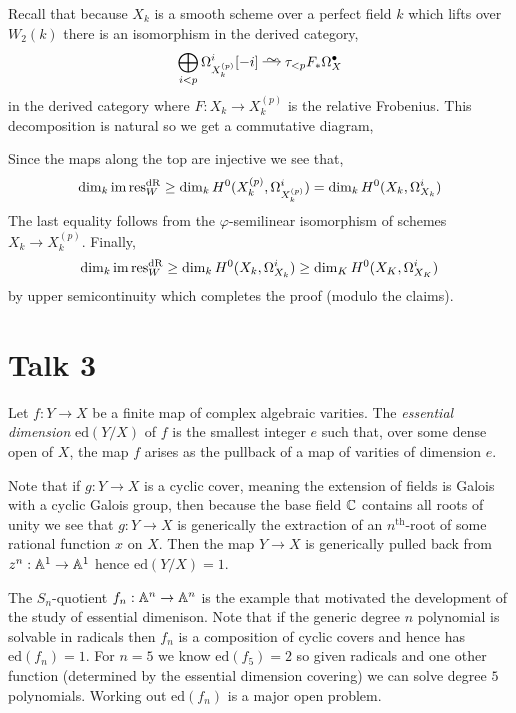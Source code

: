 \documentclass[12pt]{article}
\begin{document}
Recall that because $X_k$ is a smooth scheme over a perfect field $k$ which lifts over $W_2(k)$ there is an isomorphism in the derived category,
\[  \bigoplus_{i < p} \Omega^i_{X^{(p)}_k}[-i] \iso \tau_{<p} F_* \Omega^\bullet_X \]
in the derived category where $F : X_k \to X_k^{(p)}$ is the relative Frobenius. This decomposition is natural so we get a commutative diagram,
\begin{center}
\end{center}
Since the maps along the top are injective we see that,
\[ \dim_k \operatorname{\mathrm{im}}{\mathrm{res}^{\mathrm{dR}}_W} \ge \dim_k H^0(X_k^{(p)}, \Omega^i_{X_k^{(p)}}) = \dim_k H^0(X_k, \Omega^i_{X_k}) \]
The last equality follows from the $\varphi$-semilinear isomorphism of schemes $X_k \to X_k^{(p)}$.
Finally,
\[ \dim_k \operatorname{\mathrm{im}}{\mathrm{res}^{\mathrm{dR}}_W} \ge \dim_k H^0(X_k, \Omega^i_{X_k}) \ge \dim_K H^0(X_K, \Omega^i_{X_K}) \]
by upper semicontinuity which completes the proof (modulo the claims). 

\section{Talk 3}

\newcommand{\ed}{\mathrm{ed}}

\begin{defn}
Let $f : Y \to X$ be a finite map of complex algebraic varities. The \textit{essential dimension} $\ed(Y/X)$ of $f$ is the smallest integer $e$ such that, over some dense open of $X$, the map $f$ arises as the pullback of a map of varities of dimension $e$. 
\end{defn}

\begin{example}
Note that if $g : Y \to X$ is a cyclic cover, meaning the extension of fields is Galois with a cyclic Galois group, then because the base field $\mathbb{C}$ contains all roots of unity we see that $g : Y \to X$ is generically the extraction of an $n^{\text{th}}$-root of some rational function $x$ on $X$. Then the map $Y \to X$ is generically pulled back from $z^n : \mathbb{A}^1 \to \mathbb{A}^1$ hence $\ed(Y/X) = 1$. 
\end{example}

\begin{example}
The $S_n$-quotient $f_n : \mathbb{A}^n \to \mathbb{A}^n$ is the example that motivated the development of the study of essential dimenison. Note that if the generic degree $n$ polynomial is solvable in radicals then $f_n$ is a composition of cyclic covers and hence has $\ed(f_n) = 1$. For $n = 5$ we know $\ed(f_5) = 2$ so given radicals and one other function (determined by the essential dimension covering) we can solve degree $5$ polynomials. Working out $\ed(f_n)$ is a major open problem.
\end{example}
\end{document}
